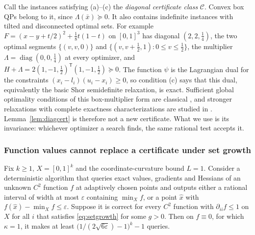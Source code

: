 \begin{remark}\label{rem:shor}
Call the instances satisfying (a)--(c) the \emph{diagonal certificate class}
$\mathcal C$. Convex box QPs belong to it, since $\Lambda(\bar x)\succeq0$. It also contains indefinite instances with tilted and
disconnected optimal sets. For example $F=(x-y+t/2)^2+\frac18t(1-t)$ on
$[0,1]^3$ has diagonal $(2,2,\frac14)$, the two optimal segments
$\{(v,v,0)\}$ and $\{(v,v+\frac12,1):0\le v\le\frac12\}$, the multiplier
$\Lambda=\operatorname{diag}(0,0,\frac14)$ at every optimizer, and
$H+\Lambda=2(1,-1,\tfrac12)^{\mathsf T}(1,-1,\tfrac12)\succeq0$. The function
$\psi$ is the Lagrangian dual for the constraints
$(x_i-l_i)(u_i-x_i)\ge0$, so condition (c) says that this dual, equivalently
the basic Shor semidefinite relaxation, is exact. Sufficient global
optimality conditions of this box-multiplier form are classical
\cite{JeyakumarRubinovWu2006,LiWuQuan2015}, and stronger relaxations with
complete exactness characterizations are studied in \cite{QiuYildirim2023}.
Lemma~\ref{lem:diagcert} is therefore not a new certificate. What we use is
its invariance: whichever optimizer a search finds, the same rational test
accepts it.
\end{remark}

\subsubsection{Function values cannot replace a certificate under set growth}

\begin{proposition}\label{prop:oraclebarrier}
Fix $k\ge1$, $X=[0,1]^k$ and the coordinate-curvature bound $L=1$. Consider a
deterministic algorithm that queries exact values, gradients and Hessians of
an unknown $C^2$ function $f$ at adaptively chosen points and outputs either a
rational interval of width at most $\varepsilon$ containing $\min_Xf$, or a
point $\hat x$ with $f(\hat x)-\min_Xf\le\varepsilon$. Suppose it is correct
for every $C^2$ function with $\partial_{ii}f\le1$ on $X$ for all $i$ that
satisfies \eqref{eq:setgrowth} for some $g>0$. Then on $f\equiv0$, for which
$\kappa=1$, it makes at least $\bigl(1/(2\sqrt{6\varepsilon})-1\bigr)^k-1$
queries.
\end{proposition}

